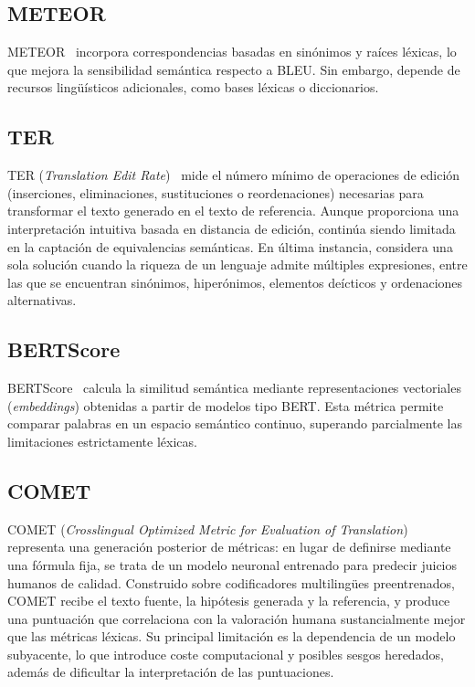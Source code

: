 \subsection{METEOR}

METEOR~\cite{Banerjee2005} incorpora correspondencias basadas en sinónimos y
raíces léxicas, lo que mejora la sensibilidad semántica respecto a BLEU. Sin
embargo, depende de recursos lingüísticos adicionales, como bases léxicas o
diccionarios.

\subsection{TER}

TER (\textit{Translation Edit Rate})~\cite{Snover2006} mide el número mínimo de
operaciones de edición (inserciones, eliminaciones, sustituciones o
reordenaciones) necesarias para transformar el texto generado en el texto de
referencia. Aunque proporciona una interpretación intuitiva basada en distancia
de edición, continúa siendo limitada en la captación de equivalencias
semánticas. En última instancia, considera una sola solución cuando la riqueza
de un lenguaje admite múltiples expresiones, entre las que se encuentran
sinónimos, hiperónimos, elementos deícticos y ordenaciones alternativas.

\subsection{BERTScore}

BERTScore~\cite{ZhangBERTScore2020} calcula la similitud semántica mediante
representaciones vectoriales (\textit{embeddings}) obtenidas a partir de
modelos tipo BERT. Esta métrica permite comparar palabras en un espacio
semántico continuo, superando parcialmente las limitaciones estrictamente
léxicas.

\subsection{COMET}

COMET (\textit{Crosslingual Optimized Metric for Evaluation of
	Translation})~\cite{Rei2020} representa una generación posterior de métricas:
en lugar de definirse mediante una fórmula fija, se trata de un modelo neuronal
entrenado para predecir juicios humanos de calidad. Construido sobre
codificadores multilingües preentrenados, COMET recibe el texto fuente, la
hipótesis generada y la referencia, y produce una puntuación que correlaciona
con la valoración humana sustancialmente mejor que las métricas léxicas. Su
principal limitación es la dependencia de un modelo subyacente, lo que
introduce coste computacional y posibles sesgos heredados, además de dificultar
la interpretación de las puntuaciones.

